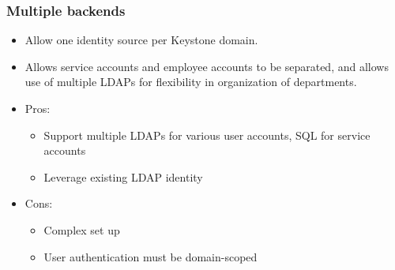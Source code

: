 \documentclass{article}
\begin{document}
\subsubsection{Multiple backends}
\begin{itemize}
    \item Allow one identity source per Keystone domain. 
    
    \item Allows service accounts and employee accounts to be separated, and allows use of multiple LDAPs for flexibility in organization of departments.
    
    \item Pros:
    \begin{itemize}
        \item Support multiple LDAPs for various user accounts, SQL for service accounts
        
        \item Leverage existing LDAP identity
    \end{itemize}
    
    \item Cons:
    \begin{itemize}
        \item Complex set up
        
        \item User authentication must be domain-scoped
    \end{itemize}
\end{itemize}
\end{document}
